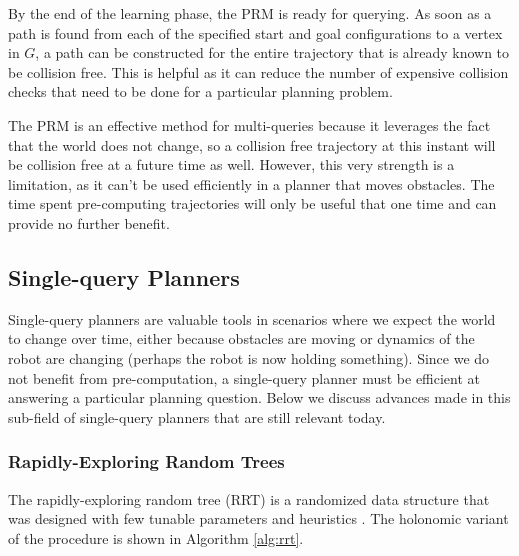 By the end of the learning phase, the PRM is ready for querying. As soon as a path is found from each of the specified start and goal configurations to a vertex in $G$, a path can be constructed for the entire trajectory that is already known to be collision free. This is helpful as it can reduce the number of expensive collision checks that need to be done for a particular planning problem. 

The PRM is an effective method for multi-queries because it leverages the fact that the world does not change, so a collision free trajectory at this instant will be collision free at a future time as well. However, this very strength is a limitation, as it can't be used efficiently in a planner that moves obstacles. The time spent pre-computing trajectories will only be useful that one time and can provide no further benefit.

\subsection{Single-query Planners}
Single-query planners are valuable tools in scenarios where we expect the world to change over time, either because obstacles are moving or dynamics of the robot are changing (perhaps the robot is now holding something). Since we do not benefit from pre-computation, a single-query planner must be efficient at answering a particular planning question. Below we discuss advances made in this sub-field of single-query planners that are still relevant today.

\subsubsection{Rapidly-Exploring Random Trees} \label{planning:rrt}
The rapidly-exploring random tree (RRT) is a randomized data structure that was designed with few tunable parameters and heuristics \cite{lavalle:rrt}. The holonomic variant of the procedure is shown in Algorithm \ref{alg:rrt}.

{}

